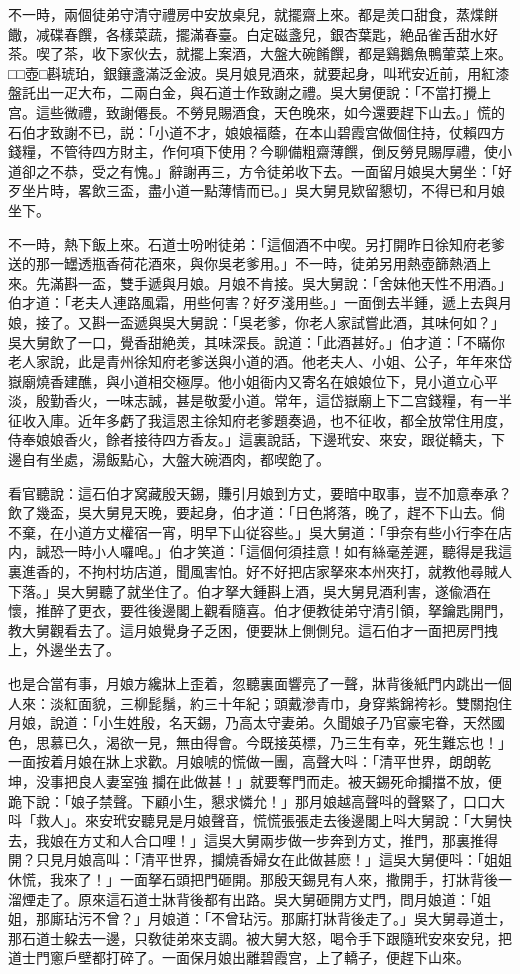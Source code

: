 不一時，兩個徒弟守清守禮房中安放桌兒，就擺齋上來。都是羙口甜食，蒸煠餅饊，减碟春饌，各樣菜蔬，擺滿春臺。白定磁盞兒，銀杏葉匙，絶品雀舌甜水好茶。喫了茶，收下家伙去，就擺上案酒，大盤大碗餚饌，都是鷄鵝魚鴨葷菜上來。□□壺□斟琥珀，銀鑲盞滿泛金波。吳月娘見酒來，就要起身，叫玳安近前，用紅漆盤託出一疋大布，二兩白金，與石道士作致謝之禮。吳大舅便說：「不當打攪上宫。這些微禮，致謝僊長。不勞見賜酒食，天色晚來，如今還要趕下山去。」慌的石伯才致謝不已，説：「小道不才，娘娘福蔭，在本山碧霞宫做個住持，仗賴四方錢糧，不管待四方財主，作何項下使用？今聊備粗齋薄饌，倒反勞見賜厚禮，使小道卻之不恭，受之有愧。」辭謝再三，方令徒弟收下去。一面留月娘吳大舅坐：「好歹坐片時，畧飲三盃，盡小道一點薄情而已。」吳大舅見欵留懇切，不得已和月娘坐下。

不一時，熱下飯上來。石道士吩咐徒弟：「這個酒不中喫。另打開昨日徐知府老爹送的那一罎透瓶香荷花酒來，與你吳老爹用。」不一時，徒弟另用熱壺篩熱酒上來。先滿斟一盃，雙手遞與月娘。月娘不肯接。吳大舅說：「舍妹他天性不用酒。」伯才道：「老夫人連路風霜，用些何害？好歹淺用些。」一面倒去半鍾，遞上去與月娘，接了。又斟一盃遞與吳大舅說：「吳老爹，你老人家試嘗此酒，其味何如？」吳大舅飲了一口，覺香甜絶羙，其味深長。說道：「此酒甚好。」伯才道：「不瞞你老人家說，此是青州徐知府老爹送與小道的酒。他老夫人、小姐、公子，年年來岱嶽廟燒香建醮，與小道相交極厚。他小姐衙内又寄名在娘娘位下，見小道立心平淡，殷勤香火，一味志誠，甚是敬愛小道。常年，這岱嶽廟上下二宫錢糧，有一半征收入庫。近年多虧了我這恩主徐知府老爹題奏過，也不征收，都全放常住用度，侍奉娘娘香火，餘者接待四方香友。」這裏說話，下邊玳安、來安，跟従轎夫，下邊自有坐處，湯飯點心，大盤大碗酒肉，都喫飽了。

看官聽說：這石伯才窝藏殷天錫，賺引月娘到方丈，要暗中取事，豈不加意奉承？飲了幾盃，吳大舅見天晚，要起身，伯才道：「日色將落，晚了，趕不下山去。倘不棄，在小道方丈權宿一宵，明早下山従容些。」吳大舅道：「爭奈有些小行李在店内，誠恐一時小人囉唣。」伯才笑道：「這個何須挂意！如有絲毫差遲，聽得是我這裏進香的，不拘村坊店道，聞風害怕。好不好把店家拏來本州夾打，就教他尋賊人下落。」吳大舅聽了就坐住了。伯才拏大鍾斟上酒，吳大舅見酒利害，遂偸酒在懷，推醉了更衣，要徃後邊閣上觀看隨喜。伯才便教徒弟守清引領，拏鑰匙開門，教大舅觀看去了。這月娘覺身子乏困，便要牀上側側兒。這石伯才一面把房門拽上，外邊坐去了。

也是合當有事，月娘方纔牀上歪着，忽聽裏面響亮了一聲，牀背後紙門内跳出一個人來：淡紅面貌，三柳髭鬚，約三十年紀；頭戴滲青巾，身穿紫錦袴衫。雙關抱住月娘，說道：「小生姓殷，名天錫，乃高太守妻弟。久聞娘子乃官豪宅眷，天然國色，思慕已久，渴欲一見，無由得會。今既接英標，乃三生有幸，死生難忘也！」一面按着月娘在牀上求歡。月娘唬的慌做一團，高聲大呌：「清平世界，朗朗乾坤，没事把良人妻室強𢺞攔在此做甚！」就要奪門而走。被天錫死命攔擋不放，便跪下說：「娘子禁聲。下顧小生，懇求憐允！」那月娘越高聲呌的聲緊了，口口大呌「救人」。來安玳安聽見是月娘聲音，慌慌張張走去後邊閣上呌大舅說：「大舅快去，我娘在方丈和人合口哩！」這吳大舅兩步做一步奔到方丈，推門，那裏推得開？只見月娘高叫：「清平世界，攔燒香婦女在此做甚麽！」這吳大舅便呌：「姐姐休慌，我來了！」一面拏石頭把門砸開。那殷天錫見有人來，撒開手，打牀背後一溜煙走了。原來這石道士牀背後都有出路。吳大舅砸開方丈門，問月娘道：「姐姐，那廝玷污不曾？」月娘道：「不曾玷污。那廝打牀背後走了。」吳大舅尋道士，那石道士躱去一邊，只敎徒弟來支調。被大舅大怒，喝令手下跟隨玳安來安兒，把道士門窻戶壁都打碎了。一面保月娘出離碧霞宫，上了轎子，便趕下山來。


